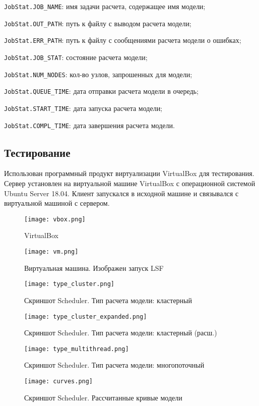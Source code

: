 \lstinline{JobStat.JOB_NAME}: имя задачи расчета, содержащее имя модели;

\lstinline{JobStat.OUT_PATH}: путь к файлу с выводом расчета модели;

\lstinline{JobStat.ERR_PATH}: путь к файлу с сообщениями расчета модели о ошибках;

\lstinline{JobStat.JOB_STAT}: состояние расчета модели;

\lstinline{JobStat.NUM_NODES}: кол-во узлов, запрошенных для модели;

\lstinline{JobStat.QUEUE_TIME}: дата отправки расчета модели в очередь;

\lstinline{JobStat.START_TIME}: дата запуска расчета модели;

\lstinline{JobStat.COMPL_TIME}: дата завершения расчета модели.

\subsection{Тестирование}

Использован программный продукт виртуализации VirtualBox для тестирования. Сервер установлен на виртуальной машине VirtualBox с операционной системой Ubuntu Server 18.04. Клиент запускался в исходной машине и связывался с виртуальной машиной с сервером.

\begin{figure}[h]
    \centering
    \texttt{[image: vbox.png]}
    \caption{VirtualBox}
\end{figure}

\begin{figure}[h]
    \centering
    \texttt{[image: vm.png]}
    \caption{Виртуальная машина. Изображен запуск LSF}
\end{figure}

\begin{figure}[h]
    \centering
    \texttt{[image: type\_cluster.png]}
    \caption{Скриншот Scheduler. Тип расчета модели: кластерный}
\end{figure}

\begin{figure}[h]
    \centering
    \texttt{[image: type\_cluster\_expanded.png]}
    \caption{Скриншот Scheduler. Тип расчета модели: кластерный (расш.)}
\end{figure}

\begin{figure}[h]
    \centering
    \texttt{[image: type\_multithread.png]}
    \caption{Скриншот Scheduler. Тип расчета модели: многопоточный}
\end{figure}

\begin{figure}[h]
    \centering
    \texttt{[image: curves.png]}
    \caption{Скриншот Scheduler. Рассчитанные кривые модели}
\end{figure}

\clearpage
